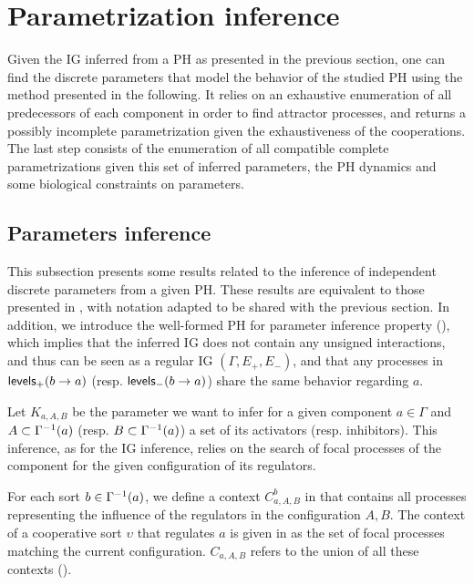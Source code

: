 \section{Parametrization inference}\label{sec:infer-K}

Given the IG inferred from a PH as presented in the previous section, one can find the discrete parameters that model the behavior of the studied PH using the method presented in the following.
It relies on an exhaustive enumeration of all predecessors of each component in order to find attractor processes, and returns a possibly incomplete parametrization given the exhaustiveness of the cooperations.
The last step consists of the enumeration of all compatible complete parametrizations given this
set of inferred parameters, the PH dynamics and some biological constraints on parameters.

\subsection{Parameters inference}

This subsection presents some results related to the inference of independent discrete parameters from a given PH. These results are equivalent to those presented in \cite{PMR10-TCSB}, with notation adapted to be shared with the previous section.
In addition, we introduce the well-formed PH for parameter inference property (),
which implies that the inferred IG does not contain any unsigned interactions, and thus can be seen as a
regular IG $(\Gamma, E_+, E_-)$,
and that any processes in $\mathsf{levels}_+(b\rightarrow a)$ (resp. $\mathsf{levels}_-(b\rightarrow a)$) share the same behavior
regarding $a$.

Let $K_{a,A,B}$ be the parameter we want to infer for a given component $a \in \Gamma$
and $A \subset \Gamma^{-1}(a)$ (resp. $B \subset \Gamma^{-1}(a)$) a set of its activators (resp. inhibitors).
This inference, as for the IG inference, relies on the search of focal processes of the component for the given configuration of its regulators.

For each sort $b \in \Gamma^{-1}(a)$, we define a context $C^b_{a,A,B}$ in  that contains all processes representing the influence of the regulators in the configuration $A,B$.
The context of a cooperative sort $\upsilon$ that regulates $a$ is given in
 as the set of focal processes matching the current configuration.
$C_{a,A,B}$ refers to the union of all these contexts ().

